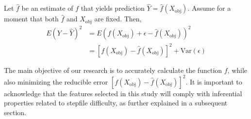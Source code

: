 \vspace{2mm}

Let $\hat{f}$ be an estimate of $f$ that yields prediction $\hat{Y} = \hat{f}(X_{\text{obj}})$. Assume for a moment that both $\hat{f}$ and $X_{\text{obj}}$ are fixed. Then,
\begin{align*}
    E(Y - \hat{Y})^2 & = E(f(X_{\text{obj}}) + \epsilon - \hat{f}(X_{\text{obj}}))^2 \\
    & = [f(X_{\text{obj}}) - \hat{f}(X_{\text{obj}})]^2 + \text{Var}(\epsilon)
\end{align*}

The main objective of our research is to accurately calculate the function $f$, while also minimizing the reducible error $[f(X_{\text{obj}}) - \hat{f}(X_{\text{obj}})]^2$. It is important to acknowledge that the features selected in this study will comply with inferential properties related to stepfile difficulty, as further explained in a subsequent section. 
\vspace{2mm}






